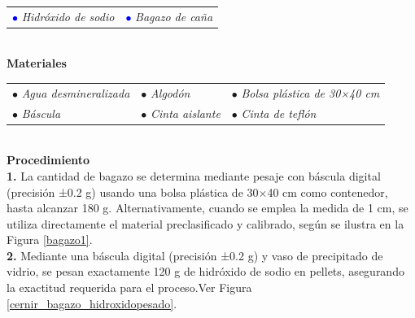 \documentclass[12pt]{article}
\begin{document}
			\begin{tabular}{p{0.3\textwidth}p{}}
				\textcolor{blue}{$\bullet$} \textit{Hidróxido de sodio} &	\textcolor{blue}{$\bullet$}\textit{ Bagazo de caña} 
			\end{tabular} \\[ 1em]
			
			
			
			\textbf{Materiales} 
			\\[1 em]
			
			\begin{tabular}{p{}p{}p{}}
				$\bullet$ \textit{Agua desmineralizada }& $\bullet$ \textit{Algodón }& $\bullet$ \textit{Bolsa plástica de 30×40 cm} \\
				$\bullet$ \textit{Báscula} & $\bullet$ \textit{Cinta aislante} & $\bullet$ \textit{Cinta de teflón}
			\end{tabular}
			\\[0.5em]
			
			
			\textbf{Procedimiento}
			\\[0.5em]
			
			\textbf{1.}	La cantidad de bagazo se determina mediante pesaje con báscula digital (precisión ±0.2 g) usando una bolsa plástica de 30×40 cm como contenedor, hasta alcanzar 180 g. Alternativamente, cuando se emplea la medida de 1 cm, se utiliza directamente el material preclasificado y calibrado, según se ilustra en la Figura \ref{bagazo1}.\\
			
			\textbf{2.} Mediante una báscula digital (precisión ±0.2 g) y vaso de precipitado de vidrio, se pesan exactamente 120 g de hidróxido de sodio en pellets, asegurando la exactitud requerida para el proceso.Ver Figura \ref{cernir_bagazo_hidroxidopesado}.
			
\end{document}
